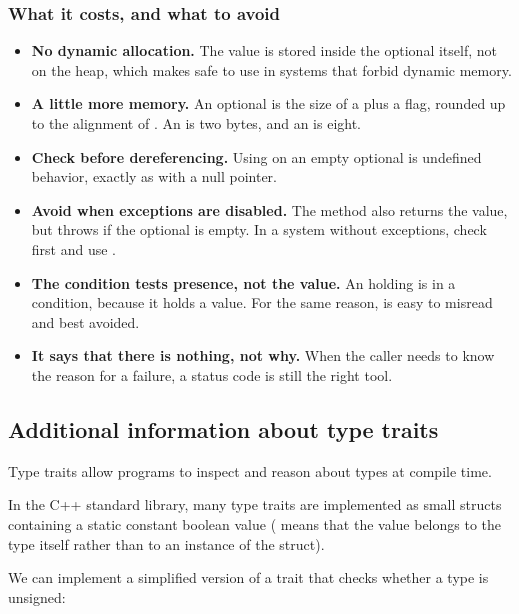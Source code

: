 \subsubsection{What it costs, and what to avoid}
\begin{itemize}
  \item \textbf{No dynamic allocation.} The value is stored inside the optional itself, not on the
    heap, which makes  safe to use in systems that forbid dynamic memory.
  \item \textbf{A little more memory.} An optional is the size of a  plus a flag, rounded
    up to the alignment of . An  is two bytes, and an
     is eight.
  \item \textbf{Check before dereferencing.} Using \code{*} on an empty optional is undefined
    behavior, exactly as with a null pointer.
  \item \textbf{Avoid  when exceptions are disabled.} The method  also
    returns the value, but throws  if the optional is empty. In a
    system without exceptions, check first and use \code{*}.
  \item \textbf{The condition tests presence, not the value.} An
     holding  is  in a condition, because it
    holds a value. For the same reason,  is easy to misread and best
    avoided.
  \item \textbf{It says that there is nothing, not why.} When the caller needs to know the reason
    for a failure, a status code is still the right tool.
\end{itemize}

\subsection{Additional information about type traits}
\label{c1:sec:typetraits}
Type traits allow programs to inspect and reason about types at compile time.

In the C++ standard library, many type traits are implemented as small structs containing a static
constant boolean value ( means that the value belongs to the type itself rather than
to an instance of the struct).

We can implement a simplified version of a trait that checks whether a type is unsigned:


